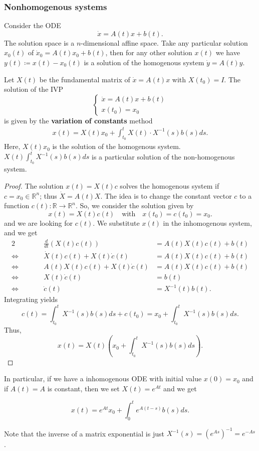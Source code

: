 \documentclass[hidelinks,a4paper, 11pt]{article}
\theoremstyle{plain}
\theoremstyle{break}
\theoremstyle{plain}
\theoremstyle{definition}
\begin{document}
\subsubsection{Nonhomogenous  systems}
Consider the ODE
\[
	\dot x = A(t)x + b(t).
\]
The solution space is a $n$-dimensional affine space. Take any particular solution $x_0(t)$ of $\dot x_0 = A(t)x_0 + b(t)$, then for any other solution $x(t)$ we have $y(t) \coloneqq x(t)-x_0(t)$ is a solution of the homogenous system $\dot y = A(t)y$.

Let $X(t)$ be the fundamental matrix of $\dot x = A(t)x$ with $X(t_0) = I$. The solution of the IVP
\[
	\begin{cases}
		\dot x = A(t)x + b(t) \\
		x(t_0) = x_0
	\end{cases}
\]
is given by the \textbf{variation of constants} method
\begin{align}\label{formula:variation-of-constants}
	x(t) = X(t)x_0 + \int^t_{t_0} X(t) \cdot X^{-1}(s)b(s) ds \tag{Variation of constants}.
\end{align}
Here, $X(t)x_0$ is the solution of the homogenous system. $X(t)\int^t_{t_0} X^{-1}(s)b(s) ds$ is a particular solution of the non-homogenous system.
\begin{proof}
	The solution $x(t) = X(t)c$ solves the homogenous system if $c = x_0 \in \mathbb R^n$; thus $\dot X = A(t)X$. The idea is to change the constant vector $c$ to a function $c(t): \mathbb R \to \mathbb R^n$. So, we consider the solution given by 
	\[
		x(t) = X(t) c(t) \quad \text{with} \quad x(t_0) = c(t_0) = x_0.
	\]
	 and we are looking for $c(t)$. We substitute $x(t)$ in the inhomogenous system, and we get
	\begin{alignat*}{2}
	 	& \qquad & \frac{d}{dt}(X(t)c(t)) &= A(t)X(t)c(t) + b(t) \\
		\iff &&  \dot X(t)c(t) + X(t) \dot c(t) &= A(t)X(t)c(t) + b(t) \\
		\iff &&  A(t)X(t)c(t) + X(t) \dot c(t) &= A(t)X(t)c(t) + b(t) \\
		\iff &&  X(t)\dot c(t) &= b(t) \\
		\iff &&  \dot c (t) &= X^{-1}(t)b(t).
	\end{alignat*}
	Integrating yields
	\[
		c(t) = \int^t_{t_0}X^{-1}(s)b(s)ds + c(t_0) = x_0 + \int^t_{t_0}X^{-1}(s)b(s)ds.
	\]
	Thus,
	\[
		x(t) = X(t)\left( x_0 + \int^t_{t_0}X^{-1}(s)b(s)ds \right).
	\]
\end{proof}

In particular, if we have a inhomogenous ODE with initial value $x(0) = x_0$ and if $A(t) = A$ is constant, then we set $X(t) = e^{At}$ and we get
\begin{framed}
\[
	x(t) = e^{At}x_0 + \int^t_{0}e^{A(t-s)}b(s)ds.
\]
\end{framed}
Note that the inverse of a matrix exponential is just $X^{-1}(s) = (e^{As})^{-1} = e^{-As}$.
\end{document}

